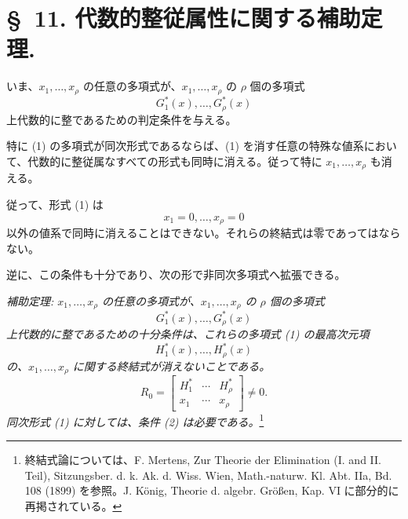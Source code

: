 \documentclass[11pt]{article}
\begin{document}
\section*{\S\ 11. 代数的整従属性に関する補助定理.}

いま、$x_1,\ldots,x_\rho$ の任意の多項式が、$x_1,\ldots,x_\rho$ の $\rho$ 個の多項式
\begin{equation}
  G_1^*(x),\ldots,G_\rho^*(x)
\tag{1}
\end{equation}
上代数的に整であるための判定条件を与える。

特に (1) の多項式が同次形式であるならば、(1) を消す任意の特殊な値系において、代数的に整従属なすべての形式も同時に消える。従って特に $x_1,\ldots,x_\rho$ も消える。

従って、形式 (1) は
\[
  x_1=0,
  \ldots,
  x_\rho=0
\]
以外の値系で同時に消えることはできない。それらの終結式は零であってはならない。

逆に、この条件も十分であり、次の形で非同次多項式へ拡張できる。

\emph{補助定理: $x_1,\ldots,x_\rho$ の任意の多項式が、$x_1,\ldots,x_\rho$ の $\rho$ 個の多項式}
\[
  G_1^*(x),\ldots,G_\rho^*(x)
\]
\emph{上代数的に整であるための十分条件は、これらの多項式 (1) の最高次元項}
\[
  H_1^*(x),\ldots,H_\rho^*(x)
\]
\emph{の、$x_1,\ldots,x_\rho$ に関する終結式が消えないことである。}
\begin{equation}
  R_0=\left[
  \begin{array}{ccc}
    H_1^*&\cdots&H_\rho^*\\
    x_1&\cdots&x_\rho
  \end{array}
  \right]\ne0.
\tag{2}
\end{equation}
\emph{同次形式 (1) に対しては、条件 (2) は必要である。}\footnote{終結式論については、F. Mertens, Zur Theorie der Elimination (I. and II. Teil), Sitzungsber. d. k. Ak. d. Wiss. Wien, Math.-naturw. Kl. Abt. IIa, Bd. 108 (1899) を参照。J. König, Theorie d. algebr. Größen, Kap. VI に部分的に再掲されている。}
\end{document}

